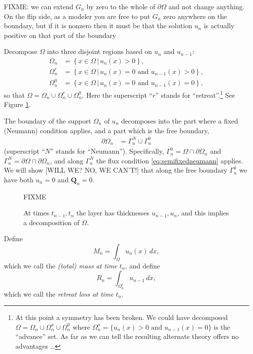 \documentclass[final,leqno,onefignum,onetabnum]{siamltex1213bueler}
\newcommand\bQ{\mathbf{Q}}
\begin{document}
FIXME: we can extend $G_n$ by zero to the whole of $\partial \Omega$ and not change anything.  On the flip side, as a modeler you are free to put $G_n$ zero anywhere on the boundary, but if it is nonzero then it must be that the solution $u_n$ is actually positive on that part of the boundary

Decompose $\Omega$ into three disjoint regions based on $u_n$ and $u_{n-1}$:
\begin{align*}
\Omega_n &= \left\{x \in \Omega \,\big|\, u_n(x)>0\right\}, \\
\Omega_n^r &= \left\{x \in \Omega \,\big|\, u_n(x)=0 \text{ and } u_{n-1}(x) > 0\right\}, \\
\Omega_n^0 &= \left\{x \in \Omega \,\big|\, u_n(x)=0 \text{ and } u_{n-1}(x) = 0\right\},
\end{align*}
so that $\Omega = \Omega_n \cup \Omega_n^r \cup \Omega_n^0$.  Here the superscript ``$r$'' stands for ``retreat''.\footnote{At this point a symmetry has been broken.  We could have decomposed $\Omega= \Omega_n \cup \Omega_n^a \cup \Omega_n^0$ where $\Omega_n^a = \{u_n(x) > 0 \text{ and } u_{n-1}(x) = 0\}$ is the ``advance'' set.  As far as we can tell the resulting alternate theory offers no advantages \dots}  See Figure \ref{fig:domains}.

The boundary of the support $\Omega_n$ of $u_n$ decomposes into the part where a fixed (Neumann) condition applies, and a part which is the free boundary,
\begin{align*}
\partial\Omega_n &= \Gamma_n^N \cup \Gamma_n^0
\end{align*}
(superscript ``$N$'' stands for ``Neumann'').  Specifically, $\Gamma_n^0 = \Omega \cap \partial \Omega_n$ and $\Gamma_n^N = \partial \Omega \cap \partial \Omega_n$, and along $\Gamma_n^N$ the flux condition \eqref{eq:semifixedneumann} applies.  We will show [WILL WE?  NO, WE CAN'T!] that along the free boundary $\Gamma_n^0$ we have both $u_n=0$ and $\bQ_n = 0$.

\begin{figure}[ht]
\vspace{1.0in}
\centerline{FIXME}
\vspace{1.0in}
\caption{At times $t_{n-1},t_n$ the layer has thicknesses $u_{n-1},u_n$, and this implies a decomposition of $\Omega$.}
\label{fig:domains}
\end{figure}

Define
\begin{equation}
M_n = \int_\Omega u_n(x)\,dx,
\end{equation}
which we call the \emph{(total) mass at time} $t_n$, and define
\begin{equation}
R_n = \int_{\Omega_n^r} u_{n-1}\,dx,
\end{equation}
which we call the \emph{retreat loss at time} $t_n$.
\end{document}
